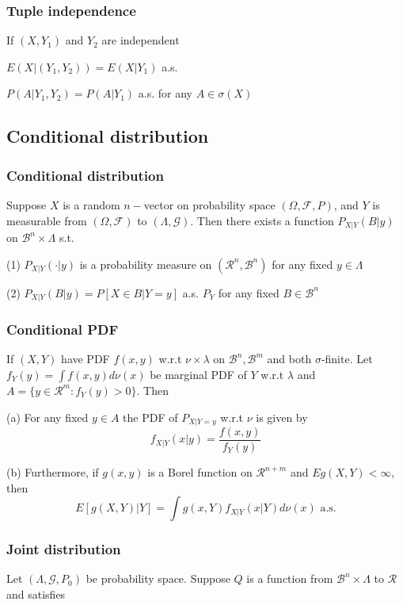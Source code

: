 \subsubsection{Tuple independence}
If $(X, Y_1)$ and $Y_2$ are independent

$E(X|(Y_1, Y_2)) = E(X|Y_1)$ a.s.

$P(A|Y_1, Y_2) = P(A|Y_1)$ a.s. for any $A\in\sigma(X)$

\subsection{Conditional distribution}

\subsubsection{Conditional distribution}

Suppose $X$ is a random $n-$vector on probability space $(\Omega, \mathcal{F}, P)$, and $Y$ is measurable from $(\Omega, \mathcal{F})$ to $(\Lambda, \mathcal{G})$. Then there exists a function $P_{X|Y}(B|y)$ on $\mathcal{B}^n\times \Lambda $ s.t.

(1) $P_{X|Y}(\cdot|y)$ is a probability measure on $(\mathcal{R}^n, \mathcal{B}^n)$ for any fixed $y\in\Lambda$

(2) $P_{X|Y}(B|y)=P[X\in B |Y = y]$ a.s. $P_Y$ for any fixed $B\in \mathcal{B}^n$

\subsubsection{Conditional PDF}
If $(X, Y)$ have PDF $f(x, y)$ w.r.t $\nu\times\lambda$ on $\mathcal{B}^n, \mathcal{B}^m$ and both $\sigma$-finite.
Let $f_Y(y)=\int f(x, y)d\nu (x)$ be marginal PDF of $Y$ w.r.t $\lambda$ and $A=\{y\in\mathcal{R}^m:f_Y(y)>0\}$. Then

(a) For any fixed $y\in A$ the PDF of $P_{X|Y=y}$ w.r.t $\nu$ is given by 
$$
f_{X|Y}(x|y) = \frac{f(x, y)}{f_Y(y)}
$$

(b) Furthermore, if $g(x, y)$ is a Borel function on $\mathcal{R}^{n+m}$ and $Eg(X,Y) < \infty$, then
$$
E[g(X, Y)|Y] = \int g(x, Y)f_{X|Y}(x|Y) d\nu(x) \text{ a.s.}
$$

\subsubsection{Joint distribution}
Let $(\Lambda, \mathcal{G}, P_0)$ be probability space. Suppose $Q$ is a function from $\mathcal{B}^n\times \Lambda$ to $\mathcal{R}$ and satisfies

